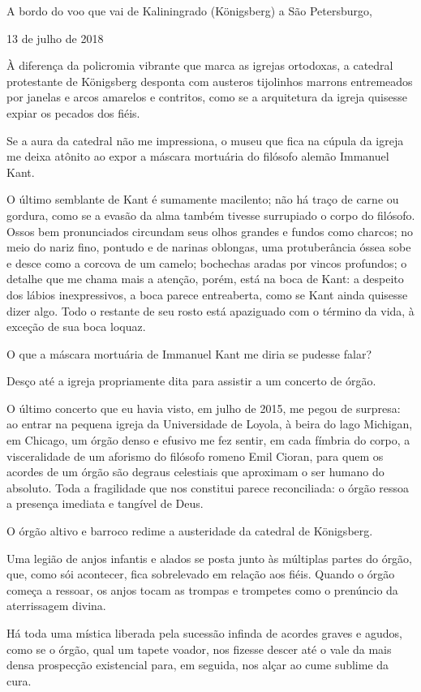 A bordo do voo que vai de Kaliningrado (Königsberg) a São Petersburgo,

13 de julho de 2018

À diferença da policromia vibrante que marca as igrejas ortodoxas, a
catedral protestante de Königsberg desponta com austeros tijolinhos
marrons entremeados por janelas e arcos amarelos e contritos, como se a
arquitetura da igreja quisesse expiar os pecados dos fiéis.

Se a aura da catedral não me impressiona, o museu que fica na cúpula da
igreja me deixa atônito ao expor a máscara mortuária do filósofo alemão
Immanuel Kant.

O último semblante de Kant é sumamente macilento; não há traço de carne
ou gordura, como se a evasão da alma também tivesse surrupiado o corpo
do filósofo. Ossos bem pronunciados circundam seus olhos grandes e
fundos como charcos; no meio do nariz fino, pontudo e de narinas
oblongas, uma protuberância óssea sobe e desce como a corcova de um
camelo; bochechas aradas por vincos profundos; o detalhe que me chama
mais a atenção, porém, está na boca de Kant: a despeito dos lábios
inexpressivos, a boca parece entreaberta, como se Kant ainda quisesse
dizer algo. Todo o restante de seu rosto está apaziguado com o término
da vida, à exceção de sua boca loquaz.

O que a máscara mortuária de Immanuel Kant me diria se pudesse falar?

Desço até a igreja propriamente dita para assistir a um concerto de
órgão.

O último concerto que eu havia visto, em julho de 2015, me pegou de
surpresa: ao entrar na pequena igreja da Universidade de Loyola, à beira
do lago Michigan, em Chicago, um órgão denso e efusivo me fez sentir, em
cada fímbria do corpo, a visceralidade de um aforismo do filósofo romeno
Emil Cioran, para quem os acordes de um órgão são degraus celestiais que
aproximam o ser humano do absoluto. Toda a fragilidade que nos constitui
parece reconciliada: o órgão ressoa a presença imediata e tangível de
Deus.

O órgão altivo e barroco redime a austeridade da catedral de Königsberg.

Uma legião de anjos infantis e alados se posta junto às múltiplas partes
do órgão, que, como sói acontecer, fica sobrelevado em relação aos
fiéis. Quando o órgão começa a ressoar, os anjos tocam as trompas e
trompetes como o prenúncio da aterrissagem divina.

Há toda uma mística liberada pela sucessão infinda de acordes graves e
agudos, como se o órgão, qual um tapete voador, nos fizesse descer até o
vale da mais densa prospecção existencial para, em seguida, nos alçar ao
cume sublime da cura.

